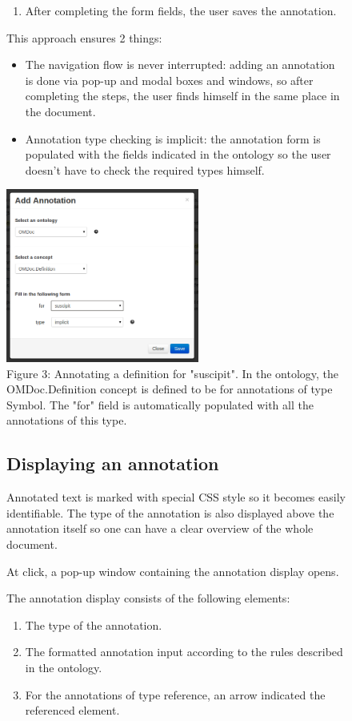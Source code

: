 \documentclass[a4paper, 12pt, notitlepage]{report}
\begin{document}
\begin{figure}[ht]
\begin{enumerate}
\item After completing the form fields, the user saves the annotation.
\end{enumerate}
This approach ensures 2 things:
\begin{itemize}
\item The navigation flow is never interrupted: adding an annotation is done via pop-up
  and modal boxes and windows, so after completing the steps, the user finds himself in
  the same place in the document.
\item Annotation type checking is implicit: the annotation form is populated with the
  fields indicated in the ontology so the user doesn’t have to check the required types
  himself.
\end{itemize}

\begin{center}
 \includegraphics[width=2.5in]{add-definition.png}\\
 \tiny{Figure 3: Annotating a definition for "suscipit". In the ontology, the OMDoc.Definition concept is defined to be for annotations of type Symbol. The "for" field is
 automatically populated with all the annotations of this type.}
\end{center}

\subsection{Displaying an annotation}

Annotated text is marked with special CSS style so it becomes easily identifiable.  The
type of the annotation is also displayed above the annotation itself so one can
have a clear overview of the whole document. 

At click, a pop-up window containing the annotation display opens.

The annotation display consists of the following elements:

\begin{enumerate}
\item The type of the annotation.
\item The formatted annotation input according to the rules described in the ontology.
\item For the annotations of type reference, an arrow indicated the referenced element.
\end{enumerate}


\end{figure}
\end{document}
